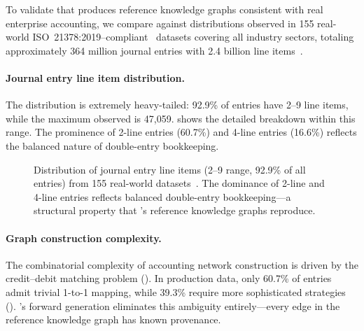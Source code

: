 To validate that \system{} produces reference knowledge graphs
consistent with real enterprise accounting,
we compare against distributions observed in 155 real-world
ISO~21378:2019--compliant~\citep{iso21378} datasets covering all
industry sectors, totaling approximately 364 million journal entries
with 2.4 billion line items~\citep{ivertowski2024hardware}.

\paragraph{Journal entry line item distribution.}
The distribution is extremely heavy-tailed: 92.9\% of entries have
2--9 line items, while the maximum observed is 47{,}059.
 shows the detailed breakdown within this range.
The prominence of 2-line entries (60.7\%) and 4-line entries (16.6\%)
reflects the balanced nature of double-entry bookkeeping.

\begin{figure}[t]
\centering
{}
\caption{Distribution of journal entry line items (2--9 range, 92.9\%
  of all entries) from 155 real-world datasets~\citep{ivertowski2024hardware}.
  The dominance of 2-line and 4-line entries reflects balanced
  double-entry bookkeeping---a structural property that \system{}'s
  reference knowledge graphs reproduce.}
\label{fig:je_line_items}
\end{figure}

\paragraph{Graph construction complexity.}
The combinatorial complexity of accounting network construction is
driven by the credit--debit matching problem
().  In production data, only 60.7\% of
entries admit trivial 1-to-1 mapping, while 39.3\% require more
sophisticated strategies ().  \system{}'s
forward generation eliminates this ambiguity entirely---every edge
in the reference knowledge graph has known provenance.

